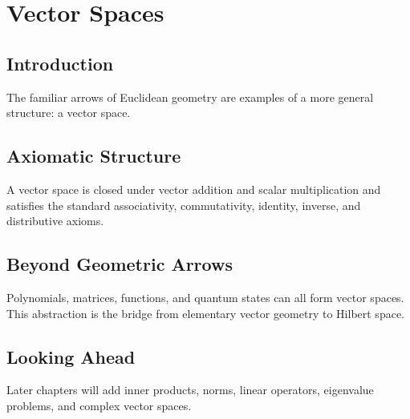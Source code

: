 \section{Vector Spaces}
\label{sec:vector-spaces}
\subsection{Introduction}
The familiar arrows of Euclidean geometry are examples of a more general structure: a vector space.
\subsection{Axiomatic Structure}
A vector space is closed under vector addition and scalar multiplication and satisfies the standard associativity, commutativity, identity, inverse, and distributive axioms.
\subsection{Beyond Geometric Arrows}
Polynomials, matrices, functions, and quantum states can all form vector spaces. This abstraction is the bridge from elementary vector geometry to Hilbert space.
\subsection{Looking Ahead}
Later chapters will add inner products, norms, linear operators, eigenvalue problems, and complex vector spaces.
